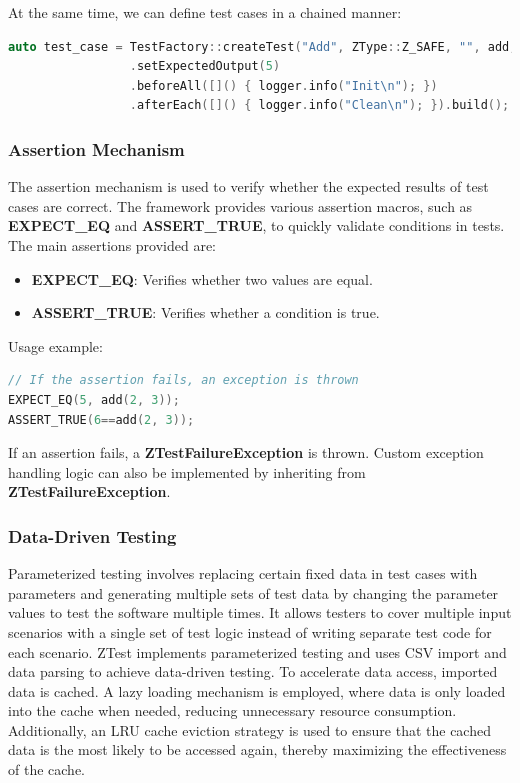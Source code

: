 \documentclass{article}
\begin{document}
At the same time, we can define test cases in a chained manner:
\begin{framed}
    \begin{lstlisting}[language=C++]
auto test_case = TestFactory::createTest("Add", ZType::Z_SAFE, "", add, 2, 3)
                 .setExpectedOutput(5)
                 .beforeAll([]() { logger.info("Init\n"); })          
                 .afterEach([]() { logger.info("Clean\n"); }).build();
                \end{lstlisting}
\end{framed}

\subsubsection{Assertion Mechanism}
The assertion mechanism is used to verify whether the expected results of test cases are correct. The framework provides various assertion macros, such as \textbf{EXPECT\_EQ} and \textbf{ASSERT\_TRUE}, to quickly validate conditions in tests.
The main assertions provided are:
\begin{itemize}
    \item \textbf{EXPECT\_EQ}: Verifies whether two values are equal.
    \item \textbf{ASSERT\_TRUE}: Verifies whether a condition is true.
\end{itemize}
Usage example:
\begin{lstlisting}[language=C++]
// If the assertion fails, an exception is thrown
EXPECT_EQ(5, add(2, 3));
ASSERT_TRUE(6==add(2, 3));
\end{lstlisting}

If an assertion fails, a \textbf{ZTestFailureException} is thrown. Custom exception handling logic can also be implemented by inheriting from \textbf{ZTestFailureException}.
\subsubsection{Data-Driven Testing}
Parameterized testing involves replacing certain fixed data in test cases with parameters and generating multiple sets of test data by changing the parameter values to test the software multiple times. It allows testers to cover multiple input scenarios with a single set of test logic instead of writing separate test code for each scenario.
ZTest implements parameterized testing and uses CSV import and data parsing to achieve data-driven testing. To accelerate data access, imported data is cached. A lazy loading mechanism is employed, where data is only loaded into the cache when needed, reducing unnecessary resource consumption. Additionally, an LRU cache eviction strategy is used to ensure that the cached data is the most likely to be accessed again, thereby maximizing the effectiveness of the cache.
\end{document}
